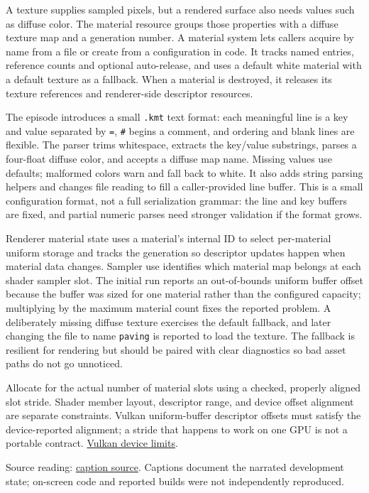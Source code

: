 A texture supplies sampled pixels, but a rendered surface also needs values such as diffuse color. The material resource groups those properties with a diffuse texture map and a generation number. A material system lets callers acquire by name from a file or create from a configuration in code. It tracks named entries, reference counts and optional auto-release, and uses a default white material with a default texture as a fallback. When a material is destroyed, it releases its texture references and renderer-side descriptor resources.

The episode introduces a small \texttt{.kmt} text format: each meaningful line is a key and value separated by \texttt{=}, \texttt{\#} begins a comment, and ordering and blank lines are flexible. The parser trims whitespace, extracts the key/value substrings, parses a four-float diffuse color, and accepts a diffuse map name. Missing values use defaults; malformed colors warn and fall back to white. It also adds string parsing helpers and changes file reading to fill a caller-provided line buffer. This is a small configuration format, not a full serialization grammar: the line and key buffers are fixed, and partial numeric parses need stronger validation if the format grows.

Renderer material state uses a material's internal ID to select per-material uniform storage and tracks the generation so descriptor updates happen when material data changes. Sampler use identifies which material map belongs at each shader sampler slot. The initial run reports an out-of-bounds uniform buffer offset because the buffer was sized for one material rather than the configured capacity; multiplying by the maximum material count fixes the reported problem. A deliberately missing diffuse texture exercises the default fallback, and later changing the file to name \texttt{paving} is reported to load the texture. The fallback is resilient for rendering but should be paired with clear diagnostics so bad asset paths do not go unnoticed.

Allocate for the actual number of material slots using a checked, properly aligned slot stride. Shader member layout, descriptor range, and device offset alignment are separate constraints. Vulkan uniform-buffer descriptor offsets must satisfy the device-reported alignment; a stride that happens to work on one GPU is not a portable contract. \href{https://docs.vulkan.org/refpages/latest/refpages/source/VkPhysicalDeviceLimits.html}{Vulkan device limits}.

Source reading: \href{https://www.youtube.com/watch?v=K_jD7--h7F8}{caption source}. Captions document the narrated development state; on-screen code and reported builds were not independently reproduced.

